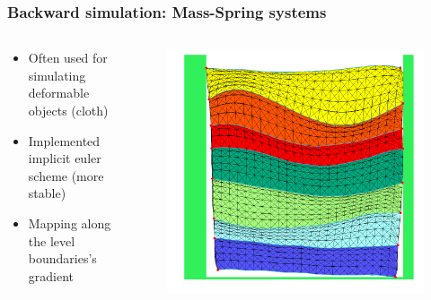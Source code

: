 \documentclass{beamer}
\begin{document}
	\begin{frame}
	\frametitle{Backward simulation: Mass-Spring systems}
	\begin{columns}
	\begin{column}{0.55\textwidth}
	\begin{itemize}
	\item Often used for simulating deformable objects (cloth)
	\item Implemented implicit euler scheme (more stable)
	\item Mapping along the level boundaries's gradient
	\end{itemize}
	\end{column}
	\begin{column}{0.55\textwidth}
	\begin{figure}[H]
	\centering
	\includegraphics[scale=0.15]{springMapping.png}
	\end{figure}
	\end{column}
	\end{columns}
	\end{frame}
	
\end{document}
